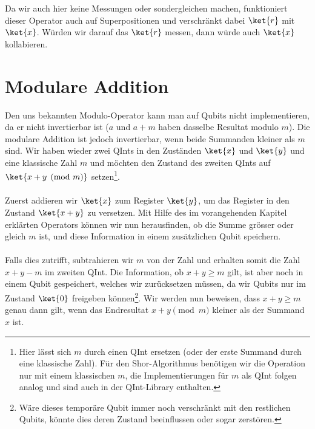 Da wir auch hier keine Messungen oder sondergleichen machen, funktioniert dieser Operator auch auf Superpositionen und verschränkt dabei $\ket{r}$ mit $\ket{x}$. Würden wir darauf das $\ket{r}$ messen, dann würde auch $\ket{x}$ kollabieren.

\section{Modulare Addition}
Den uns bekannten Modulo-Operator kann man auf Qubits nicht implementieren, da er nicht invertierbar ist ($a$ und $a + m$ haben dasselbe Resultat modulo $m$). Die modulare Addition ist jedoch invertierbar, wenn beide Summanden kleiner als $m$ sind. Wir haben wieder zwei QInts in den Zuständen $\ket{x}$ und $\ket{y}$ und eine klassische Zahl $m$ und möchten den Zustand des zweiten QInts auf $\ket{x + y \pmod{m}}$ setzen\footnote{Hier lässt sich $m$ durch einen QInt ersetzen (oder der erste Summand durch eine klassische Zahl). Für den Shor-Algorithmus benötigen wir die Operation nur mit einem klassischen $m$, die Implementierungen für $m$ als QInt folgen analog und sind auch in der QInt-Library enthalten.}.

\paragraph{}

Zuerst addieren wir $\ket{x}$ zum Register $\ket{y}$, um das Register in den Zustand $\ket{x + y}$ zu versetzen. Mit Hilfe des im vorangehenden Kapitel erklärten Operators können wir nun herausfinden, ob die Summe grösser oder gleich $m$ ist, und diese Information in einem zusätzlichen Qubit speichern.

\paragraph{}

Falls dies zutrifft, subtrahieren wir $m$ von der Zahl und erhalten somit die Zahl $x + y - m$ im zweiten QInt. Die Information, ob $x + y \geq m$ gilt, ist aber noch in einem Qubit gespeichert, welches wir zurücksetzen müssen, da wir Qubits nur im Zustand $\ket{0}$ freigeben können\footnote{Wäre dieses temporäre Qubit immer noch verschränkt mit den restlichen Qubits, könnte dies deren Zustand beeinflussen oder sogar zerstören.}. Wir werden nun beweisen, dass $x + y \geq m$ genau dann gilt, wenn das Endresultat ${x + y \pmod{m}}$ kleiner als der Summand $x$ ist. 

